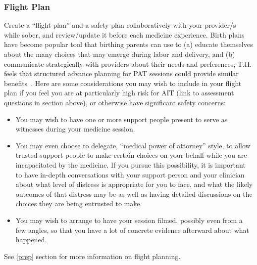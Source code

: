 \documentclass[11pt,oneside]{book}
\let\cite\parencite
\begin{document}
\subsubsection*{Flight Plan}
Create a \enquote{flight plan} and a safety plan collaboratively with your provider/s while sober, and review/update it before each medicine experience. Birth plans have become popular tool that birthing parents can use to (a) educate themselves about the many choices that may emerge during labor and delivery, and (b) communicate strategically with providers about their needs and preferences; T.H. feels that structured advance planning for PAT sessions could provide similar benefits~\cite{birthPlan}. Here are some considerations you may wish to include in your flight plan if you feel you are at particularly high risk for AIT (link to assessment questions in section above), or otherwise have significant safety concerns:
\begin{itemize}
    \item You may wish to have one or more support people present to serve as witnesses during your medicine session.
    \item You may even choose to delegate, \enquote{medical power of attorney} style, to allow trusted support people to make certain choices on your behalf while you are incapacitated by the medicine. If you pursue this possibility, it is important to have in-depth conversations with your support person and your clinician about what level of distress is appropriate for you to face, and what the likely outcomes of that distress may be-as well as having detailed discussions on the choices they are being entrusted to make. 
    \item You may wish to arrange to have your session filmed, possibly even from a few angles, so that you have a lot of concrete evidence afterward about what happened.
\end{itemize}

See \cref{prep} section for more information on flight planning.
\end{document}
